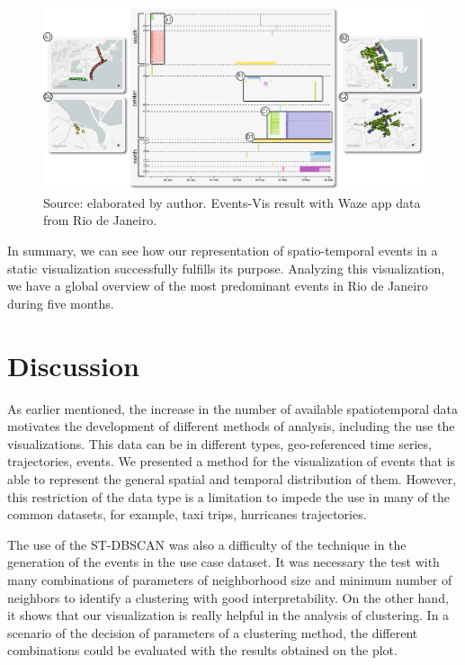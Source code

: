 \begin{figure}
    \centering
    \includegraphics[width = \linewidth]{src/imgs/waze-use-case.pdf}
    \caption{Source: elaborated by author. Events-Vis result with Waze app data from Rio de Janeiro.}
    \label{fig:waze-use-case}
\end{figure}

In summary, we can see how our representation of spatio-temporal events in a static visualization successfully fulfills its purpose. 
%
Analyzing this visualization, we have a global overview of the most predominant events in Rio de Janeiro during five months. 


\section{Discussion}
As earlier mentioned, the increase in the number of available spatiotemporal data motivates the development of different methods of analysis, including the use the visualizations.
%
This data can be in different types, geo-referenced time series, trajectories, events.
%
We presented a method for the visualization of events that is able to represent the general spatial and temporal distribution of them.
%
However, this restriction of the data type is a limitation to impede the use in many of the common datasets, for example, taxi trips, hurricanes trajectories.

The use of the ST-DBSCAN was also a difficulty of the technique in the generation of the events in the use case dataset.
%
It was necessary the test with many combinations of parameters of neighborhood size and minimum number of neighbors to identify a clustering with good interpretability.
%
On the other hand, it shows that our visualization is really helpful in the analysis of clustering.
%
In a scenario of the decision of parameters of a clustering method, the different combinations could be evaluated with the results obtained on the plot.


